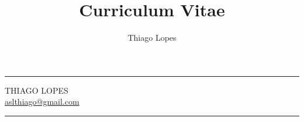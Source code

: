 \documentclass[a4, 12pt]{article}
\author{Thiago Lopes}
\title{Curriculum Vitae}
\begin{document}

\begin{center}
  \hrule
  \vspace{1em}
  {\huge\uppercase{Thiago Lopes}}\\
  \vspace{1em}
  {\large\href{mailto:aslthiago@gmail.com}{aslthiago@gmail.com}}
  \vspace{1em}
  \hrule
  \vspace{1em}
\end{center}

\end{document}
